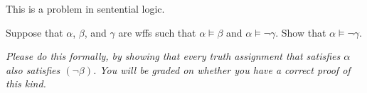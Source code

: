 \begin{problem}
  This is a problem in sentential logic.

  \step
  Suppose that $\alpha$, $\beta$, and $\gamma$ are wffs
  such that $\alpha \models \beta$ and $\alpha \models \lnot \gamma$.
  Show that $\alpha \models \lnot \gamma$.

  \step
  \emph{
    Please do this formally, by showing that every truth assignment that
    satisfies $\alpha$ also satisfies $(\lnot \beta)$.
    You will be graded on whether you have a
    correct proof of this kind.
  }
\end{problem}
